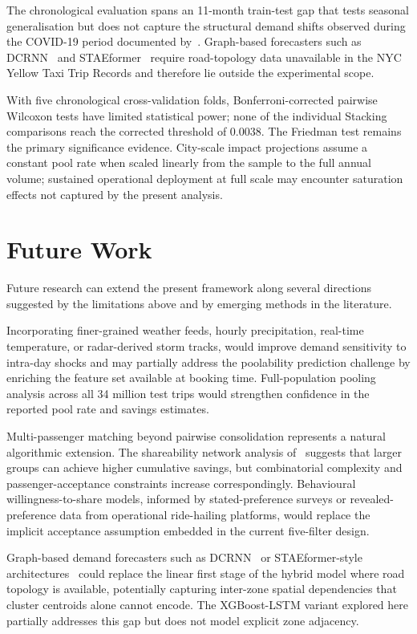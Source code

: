 The chronological evaluation spans an 11-month train-test gap that tests seasonal generalisation but does not capture the structural demand shifts observed during the COVID-19 period documented by~\parencite{liu2021epidemic}. Graph-based forecasters such as DCRNN~\parencite{li2018diffusion} and STAEformer~\parencite{liu2023staeformer} require road-topology data unavailable in the NYC Yellow Taxi Trip Records and therefore lie outside the experimental scope.

With five chronological cross-validation folds, Bonferroni-corrected pairwise Wilcoxon tests have limited statistical power; none of the individual Stacking comparisons reach the corrected threshold of $0.0038$. The Friedman test remains the primary significance evidence. City-scale impact projections assume a constant pool rate when scaled linearly from the sample to the full annual volume; sustained operational deployment at full scale may encounter saturation effects not captured by the present analysis.

\section{Future Work}

Future research can extend the present framework along several directions suggested by the limitations above and by emerging methods in the literature.

Incorporating finer-grained weather feeds, hourly precipitation, real-time temperature, or radar-derived storm tracks, would improve demand sensitivity to intra-day shocks and may partially address the poolability prediction challenge by enriching the feature set available at booking time. Full-population pooling analysis across all 34 million test trips would strengthen confidence in the reported pool rate and savings estimates.

Multi-passenger matching beyond pairwise consolidation represents a natural algorithmic extension. The shareability network analysis of~\parencite{santi2014quantifying} suggests that larger groups can achieve higher cumulative savings, but combinatorial complexity and passenger-acceptance constraints increase correspondingly. Behavioural willingness-to-share models, informed by stated-preference surveys or revealed-preference data from operational ride-hailing platforms, would replace the implicit acceptance assumption embedded in the current five-filter design.

Graph-based demand forecasters such as DCRNN~\parencite{li2018diffusion} or STAEformer-style architectures~\parencite{liu2023staeformer} could replace the linear first stage of the hybrid model where road topology is available, potentially capturing inter-zone spatial dependencies that cluster centroids alone cannot encode. The XGBoost-LSTM variant explored here partially addresses this gap but does not model explicit zone adjacency.

